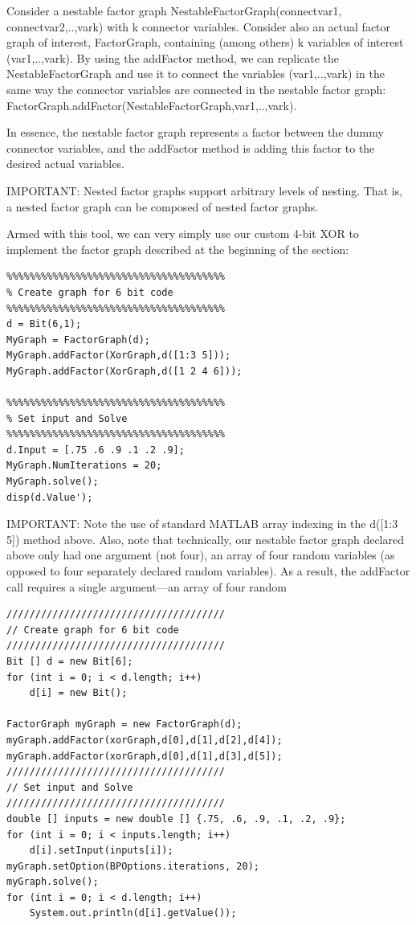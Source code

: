 Consider a nestable factor graph NestableFactorGraph(connectvar1, connectvar2,..,vark) with k connector variables. Consider also an actual factor graph of interest, FactorGraph, containing (among others) k variables of interest (var1,..,vark). By using the addFactor method, we can replicate the NestableFactorGraph and use it to connect the variables (var1,..,vark) in the same way the connector variables are connected in the nestable factor graph: FactorGraph.addFactor(NestableFactorGraph,var1,..,vark).

In essence, the nestable factor graph represents a factor between the dummy connector variables, and the addFactor method is adding this factor to the desired actual variables.

IMPORTANT: Nested factor graphs support arbitrary levels of nesting.  That is, a nested factor graph can be composed of nested factor graphs.

Armed with this tool, we can very simply use our custom 4-bit XOR to implement the factor graph described at the beginning of the section:

\ifmatlab

\begin{lstlisting}
%%%%%%%%%%%%%%%%%%%%%%%%%%%%%%%%%%%%%% 
% Create graph for 6 bit code 
%%%%%%%%%%%%%%%%%%%%%%%%%%%%%%%%%%%%%% 
d = Bit(6,1);
MyGraph = FactorGraph(d); 
MyGraph.addFactor(XorGraph,d([1:3 5])); 
MyGraph.addFactor(XorGraph,d([1 2 4 6]));

%%%%%%%%%%%%%%%%%%%%%%%%%%%%%%%%%%%%%% 
% Set input and Solve 
%%%%%%%%%%%%%%%%%%%%%%%%%%%%%%%%%%%%%% 
d.Input = [.75 .6 .9 .1 .2 .9]; 
MyGraph.NumIterations = 20;
MyGraph.solve();
disp(d.Value');
\end{lstlisting}



IMPORTANT: Note the use of standard MATLAB array indexing in the d([1:3 5]) method above. Also, note that technically, our nestable factor graph declared above only had one argument (not four), an array of four random variables (as opposed to four separately declared random variables). As a result, the addFactor call requires a single argument---an array of four random 

\fi

\ifjava
\begin{lstlisting}
////////////////////////////////////// 
// Create graph for 6 bit code 
////////////////////////////////////// 
Bit [] d = new Bit[6];
for (int i = 0; i < d.length; i++)
	d[i] = new Bit();

FactorGraph myGraph = new FactorGraph(d); 
myGraph.addFactor(xorGraph,d[0],d[1],d[2],d[4]); 
myGraph.addFactor(xorGraph,d[0],d[1],d[3],d[5]);
////////////////////////////////////// 
// Set input and Solve 
////////////////////////////////////// 
double [] inputs = new double [] {.75, .6, .9, .1, .2, .9};
for (int i = 0; i < inputs.length; i++)
	d[i].setInput(inputs[i]);
myGraph.setOption(BPOptions.iterations, 20);
myGraph.solve();
for (int i = 0; i < d.length; i++)
	System.out.println(d[i].getValue());
\end{lstlisting}
\fi

